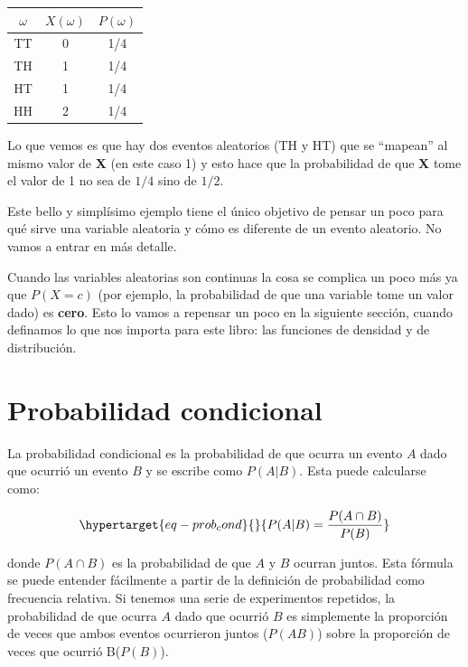 \documentclass[
  letterpaper,
  DIV=11,
  numbers=noendperiod,
  oneside]{scrreprt}
\begin{document}
\begin{longtable}[]{@{}ccc@{}}
\toprule()
\(\omega\) & \(X(\omega)\) & \(P({\omega})\) \\
\midrule()
\endhead
TT & 0 & 1/4 \\
TH & 1 & 1/4 \\
HT & 1 & 1/4 \\
HH & 2 & 1/4 \\
\bottomrule()
\end{longtable}

Lo que vemos es que hay dos eventos aleatorios (TH y HT) que se
``mapean'' al mismo valor de \textbf{X} (en este caso 1) y esto hace que
la probabilidad de que \textbf{X} tome el valor de 1 no sea de \(1/4\)
sino de \(1/2\).

Este bello y simplísimo ejemplo tiene el único objetivo de pensar un
poco para qué sirve una variable aleatoria y cómo es diferente de un
evento aleatorio. No vamos a entrar en más detalle.

Cuando las variables aleatorias son continuas la cosa se complica un
poco más ya que \(P(X=c)\) (por ejemplo, la probabilidad de que una
variable tome un valor dado) es \textbf{cero}. Esto lo vamos a repensar
un poco en la siguiente sección, cuando definamos lo que nos importa
para este libro: las funciones de densidad y de distribución.

\hypertarget{probabilidad-condicional}{%
\section{Probabilidad condicional}\label{probabilidad-condicional}}

La probabilidad condicional es la probabilidad de que ocurra un evento
\(A\) dado que ocurrió un evento \(B\) y se escribe como \(P(A|B)\).
Esta puede calcularse como:

\begin{equation}\protect\hypertarget{eq-prob_cond}{}{
P(A|B) = \frac{P(A \cap B)}{P(B)}
}\label{eq-prob_cond}\end{equation}

donde \(P(A \cap B)\) es la probabilidad de que \(A\) y \(B\) ocurran
juntos. Esta fórmula se puede entender fácilmente a partir de la
definición de probabilidad como frecuencia relativa. Si tenemos una
serie de experimentos repetidos, la probabilidad de que ocurra \(A\)
dado que ocurrió \(B\) es simplemente la proporción de veces que ambos
eventos ocurrieron juntos (\(P(AB)\)) sobre la proporción de veces que
ocurrió B(\(P(B)\)).
\end{document}
